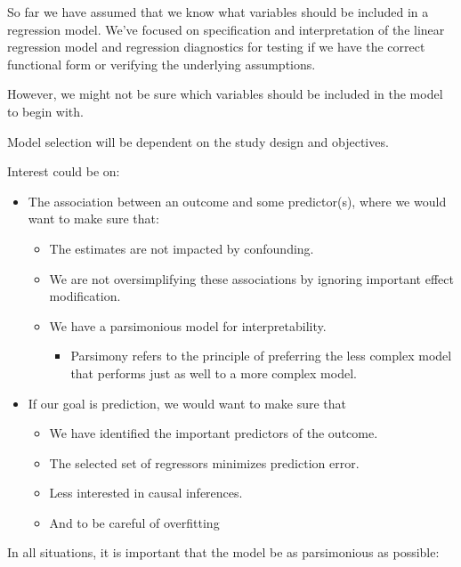 \documentclass[
  letterpaper,
  DIV=11,
  numbers=noendperiod]{scrreport}
\providecommand{\tightlist}{%
  \setlength{\itemsep}{0pt}\setlength{\parskip}{0pt}}\usepackage{longtable,booktabs,array}
\begin{document}
So far we have assumed that we know what variables should be included in
a regression model. We've focused on specification and interpretation of
the linear regression model and regression diagnostics for testing if we
have the correct functional form or verifying the underlying
assumptions.

However, we might not be sure which variables should be included in the
model to begin with.

Model selection will be dependent on the study design and objectives.

Interest could be on:

\begin{itemize}
\tightlist
\item
  The association between an outcome and some predictor(s), where we
  would want to make sure that:

  \begin{itemize}
  \tightlist
  \item
    The estimates are not impacted by confounding.
  \item
    We are not oversimplifying these associations by ignoring important
    effect modification.
  \item
    We have a parsimonious model for interpretability.

    \begin{itemize}
    \tightlist
    \item
      {Parsimony} refers to the principle of preferring the less complex
      model that performs just as well to a more complex model.
    \end{itemize}
  \end{itemize}
\item
  If our goal is prediction, we would want to make sure that

  \begin{itemize}
  \tightlist
  \item
    We have identified the important predictors of the outcome.
  \item
    The selected set of regressors minimizes prediction error.
  \item
    Less interested in causal inferences.
  \item
    And to be careful of overfitting
  \end{itemize}
\end{itemize}

In all situations, it is important that the model be as parsimonious as
possible:
\end{document}
